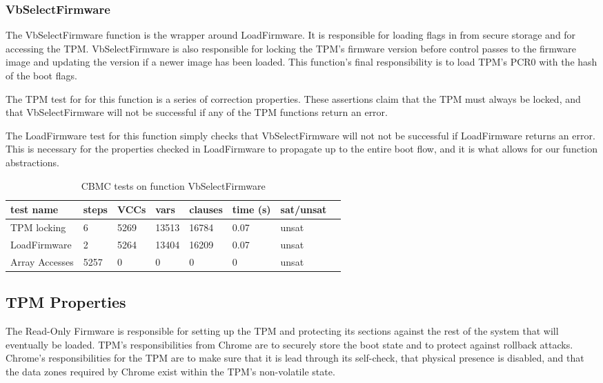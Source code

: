 \documentclass[../report.tex]{subfiles}
\begin{document}
\subsubsection{VbSelectFirmware}

The VbSelectFirmware function is the wrapper around LoadFirmware.
It is responsible for loading flags in from secure storage and for accessing the TPM\@.
VbSelectFirmware is also responsible for locking the TPM's firmware version before control passes to the firmware image and updating the version if a newer image has been loaded.
This function's final responsibility is to load TPM's PCR0 with the hash of the boot flags.

The TPM test for for this function is a series of correction properties. 
These assertions claim that the TPM must always be locked, and that VbSelectFirmware will not be successful if any of the TPM functions return an error.

The LoadFirmware test for this function simply checks that VbSelectFirmware will not not be successful if LoadFirmware returns an error.
This is necessary for the properties checked in LoadFirmware to propagate up to the entire boot flow, and it is what allows for our function abstractions.

\begin{table}[]
    \centering
    \caption{CBMC tests on function VbSelectFirmware}\label{sfw_results}
    \begin{tabular}{|l|l|l|l|l|l|l|l|}
        \hline
        test name & steps & VCCs & vars  & clauses & time (s) & sat/unsat  \\ \hline \hline
        TPM locking & 6 & 5269 & 13513 & 16784 & 0.07 & unsat \\ \hline
        LoadFirmware & 2 & 5264 & 13404 & 16209 & 0.07 & unsat \\ \hline
        Array Accesses & 5257 & 0 & 0 & 0 & 0 &  unsat \\ \hline
    \end{tabular}
\end{table}

\subsection{TPM Properties}

The Read-Only Firmware is responsible for setting up the TPM and protecting its
sections against the rest of the system that will eventually be loaded.
TPM's responsibilities from Chrome are to securely store the boot state and to protect against rollback attacks. 
Chrome's responsibilities for the TPM are to make sure that it is lead through
its self-check, that physical presence is disabled, and that the data zones
required by Chrome exist within the TPM's non-volatile state.
\end{document}
